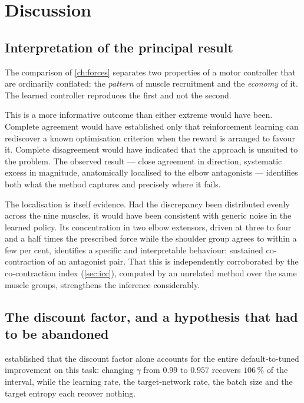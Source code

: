
\chapter{Discussion}
\label{chap:discussion}

\section{Interpretation of the principal result}

The comparison of \cref{ch:forces} separates two properties of a motor controller
that are ordinarily conflated: the \emph{pattern} of muscle recruitment and the
\emph{economy} of it. The learned controller reproduces the first and not the
second.

This is a more informative outcome than either extreme would have been. Complete
agreement would have established only that reinforcement learning can rediscover
a known optimisation criterion when the reward is arranged to favour it. Complete
disagreement would have indicated that the approach is unsuited to the problem.
The observed result --- close agreement in direction, systematic excess in
magnitude, anatomically localised to the elbow antagonists --- identifies both
what the method captures and precisely where it fails.

The localisation is itself evidence. Had the discrepancy been distributed evenly
across the nine muscles, it would have been consistent with generic noise in the
learned policy. Its concentration in two elbow extensors, driven at three to four
and a half times the prescribed force while the shoulder group agrees to within a
few per cent, identifies a specific and interpretable behaviour: sustained
co-contraction of an antagonist pair. That this is independently corroborated by
the co-contraction index (\cref{sec:icc}), computed by an unrelated method over
the same muscle groups, strengthens the inference considerably.

\section{The discount factor, and a hypothesis that had to be abandoned}

 established that the discount factor alone accounts for the
entire default-to-tuned improvement on this task: changing $\gamma$ from $0.99$ to
$0.957$ recovers $106$\,\% of the interval, while the learning rate, the
target-network rate, the batch size and the target entropy each recover nothing.

